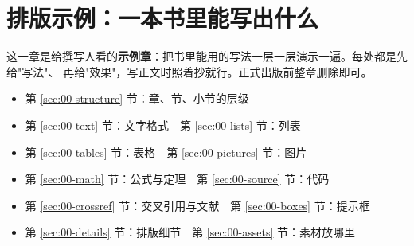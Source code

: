 \documentclass[../../main.tex]{subfiles}
\begin{document}
\setcounter{chapter}{-1}

\chapter{排版示例：一本书里能写出什么}
\label{ch:00-guide}

这一章是给撰写人看的\textbf{示例章}：把书里能用的写法一层一层演示一遍。每处都是先给"写法"、
再给"效果"，写正文时照着抄就行。正式出版前整章删除即可。

\begin{itemize}
  \item 第 \ref{sec:00-structure} 节：章、节、小节的层级
  \item 第 \ref{sec:00-text} 节：文字格式　第 \ref{sec:00-lists} 节：列表
  \item 第 \ref{sec:00-tables} 节：表格　第 \ref{sec:00-pictures} 节：图片
  \item 第 \ref{sec:00-math} 节：公式与定理　第 \ref{sec:00-source} 节：代码
  \item 第 \ref{sec:00-crossref} 节：交叉引用与文献　第 \ref{sec:00-boxes} 节：提示框
  \item 第 \ref{sec:00-details} 节：排版细节　第 \ref{sec:00-assets} 节：素材放哪里
\end{itemize}












\end{document}
